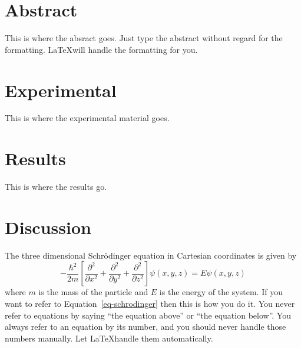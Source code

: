 \documentclass[english,letter,11pt]{scrartcl}
\date{\today}
\title{\doctitle}
\author{\docauthor}
\begin{document}
\maketitle %
\section{Abstract}
This is where the absract goes. Just type the abstract without regard for the formatting. \LaTeX will handle the formatting for you. 
\section{Experimental}
This is where the experimental material goes. 
\section{Results}
This is where the results go.
\section{Discussion}
The three dimensional Schr\"odinger equation in Cartesian coordinates is given by 
\begin{equation}\label{eq-schrodinger}
-\frac{\hbar^2}{2m}\left[\frac{\partial^2}{\partial x^2} + \frac{\partial^2}{\partial y^2} + \frac{\partial^2}{\partial z^2}\right]\psi(x,y,z) = E \psi(x,y,z)
\end{equation}
where $m$ is the mass of the particle and $E$ is the energy of the system. If you want to refer to Equation~\ref{eq-schrodinger} then this is how you do it. You never refer to equations by saying ``the equation above'' or ``the equation below''. You always refer to an equation by its number, and you should never handle those numbers manually. Let \LaTeX handle them automatically. 
\end{document}
